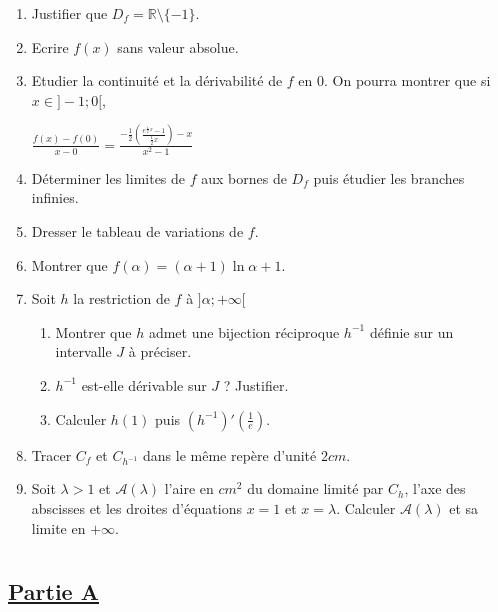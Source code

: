 \documentclass[12pt,a4paper]{article}
\begin{document}
\begin{enumerate}
    \item Justifier que \( D_f = \mathbb{R} \setminus \{-1\} \).
    \item Ecrire \( f(x) \) sans valeur absolue.
    \item Etudier la continuité et la dérivabilité de \( f \) en \( 0 \).  
    On pourra montrer que si \( x \in ]-1; 0[ \),

    \(
    \frac{f(x) - f(0)}{x - 0} = \frac{-\frac{1}{2} \left( \frac{e^{\frac{1}{2} x} - 1}{\frac{1}{2} x} \right) - x}{x^2 - 1}\)
    
    
    \item Déterminer les limites de \( f \) aux bornes de \( D_f \) puis étudier les branches infinies.
    \item Dresser le tableau de variations de \( f \).
    \item Montrer que \( f(\alpha) = (\alpha + 1) \ln \alpha + 1 \).
    \item Soit \( h \) la restriction de \( f \) à \( ]\alpha; +\infty[ \)
    \begin{enumerate}
        \item Montrer que \( h \) admet une bijection réciproque \( h^{-1} \) définie sur un intervalle \( J \) à préciser.
        \item \( h^{-1} \) est-elle dérivable sur \( J \) ? Justifier.
        \item Calculer \( h(1) \) puis \( (h^{-1})' \left( \frac{1}{e} \right) \).
    \end{enumerate}
    \item Tracer \( C_f \) et \( C_{h^{-1}} \) dans le même repère d’unité \( 2cm \).
    \item Soit \( \lambda > 1 \) et \( \mathcal{A}(\lambda) \) l’aire en \( cm^2 \) du domaine limité par \( C_h \), l’axe des abscisses et les droites d’équations \( x = 1 \) et \( x = \lambda \).  
    Calculer \( \mathcal{A}(\lambda) \) et sa limite en \( +\infty \).
\end{enumerate}

\section*{}

\subsection*{\underline{\textbf{Partie A}}}
\end{document}
